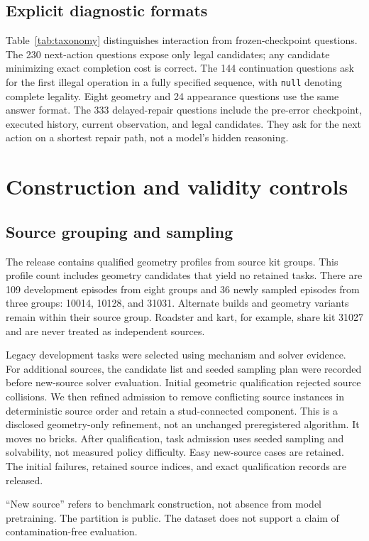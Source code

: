 \documentclass[10pt,twocolumn,letterpaper]{article}
\begin{document}
\subsection{Explicit diagnostic formats}
Table~\ref{tab:taxonomy} distinguishes interaction from frozen-checkpoint
questions. The 230 next-action questions expose only legal candidates;
any candidate minimizing exact completion cost is correct. The 144
continuation questions ask for the first illegal operation in a fully
specified sequence, with \texttt{null} denoting complete legality.
Eight geometry and 24 appearance questions use the same answer format.
The 333 delayed-repair questions include the pre-error checkpoint,
executed history, current observation, and legal candidates. They ask for
the next action on a shortest repair path, not a model's hidden reasoning.

\section{Construction and validity controls}
\subsection{Source grouping and sampling}
The release contains \ProfileCount{} qualified geometry profiles from
\SourceCount{} source kit groups. This profile count includes geometry
candidates that yield no retained tasks. There are 109 development
episodes from eight groups and 36 newly sampled episodes from three
groups: 10014, 10128, and 31031. Alternate builds and geometry variants
remain within their source group. Roadster and kart, for example, share
kit 31027 and are never treated as independent sources.

Legacy development tasks were selected using mechanism and solver
evidence. For additional sources, the candidate list and seeded sampling
plan were recorded before new-source solver evaluation. Initial geometric
qualification rejected source collisions. We then refined admission to
remove conflicting source instances in deterministic source order and
retain a stud-connected component. This is a disclosed geometry-only
refinement, not an unchanged preregistered algorithm. It moves no bricks.
After qualification, task admission uses seeded sampling and solvability,
not measured policy difficulty. Easy new-source cases are retained.
The initial failures, retained source indices, and exact qualification
records are released.

``New source'' refers to benchmark construction, not absence from model
pretraining. The partition is public. The dataset does not support a
claim of contamination-free evaluation.
\end{document}
